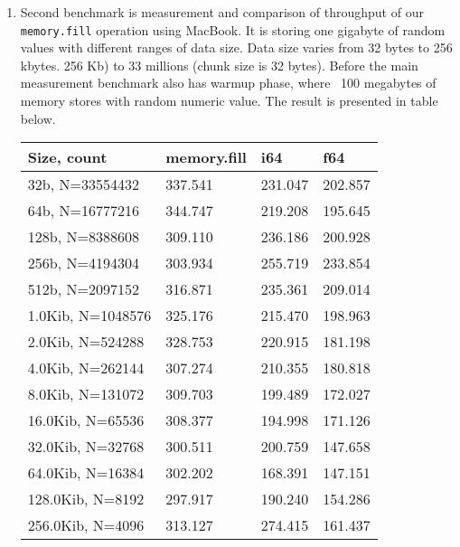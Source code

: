 \begin{enumerate}
\begin{table}[]
\begin{tabular}{|l|l|l|l|l|l|}
\end{tabular}
\end{table}

\normalsize

\vspace{3cm}

\item Second benchmark is measurement and comparison of throughput of our \texttt{memory.fill} operation using MacBook. 
      It is storing one gigabyte of random values with different ranges of data size.  
      Data size varies from 32 bytes to 256 kbytes. 256 Kb) to 33 millions (chunk size is 32 bytes).
      Before the main measurement benchmark also has warmup phase, where ~100 megabytes of memory stores with random numeric value.
      The result is presented in table below.
\small
\begin{table}[]
\vspace{1cm}
\hspace{3cm}
\begin{tabular}{|l|l|l|l|} \hline

  Size, count       & memory.fill &   i64   &   f64   \\ \hline
  32b, N=33554432   & 337.541     & 231.047 & 202.857 \\ \hline
  64b, N=16777216   & 344.747     & 219.208 & 195.645 \\ \hline
  128b, N=8388608   & 309.110     & 236.186 & 200.928 \\ \hline
  256b, N=4194304   & 303.934     & 255.719 & 233.854 \\ \hline
  512b, N=2097152   & 316.871     & 235.361 & 209.014 \\ \hline
  1.0Kib, N=1048576 & 325.176     & 215.470 & 198.963 \\ \hline
  2.0Kib, N=524288  & 328.753     & 220.915 & 181.198 \\ \hline
  4.0Kib, N=262144  & 307.274     & 210.355 & 180.818 \\ \hline
  8.0Kib, N=131072  & 309.703     & 199.489 & 172.027 \\ \hline
  16.0Kib, N=65536  & 308.377     & 194.998 & 171.126 \\ \hline
  32.0Kib, N=32768  & 300.511     & 200.759 & 147.658 \\ \hline
  64.0Kib, N=16384  & 302.202     & 168.391 & 147.151 \\ \hline
  128.0Kib, N=8192  & 297.917     & 190.240 & 154.286 \\ \hline
  256.0Kib, N=4096  & 313.127     & 274.415 & 161.437 \\ \hline
\end{tabular}
\end{table}


\end{enumerate}
